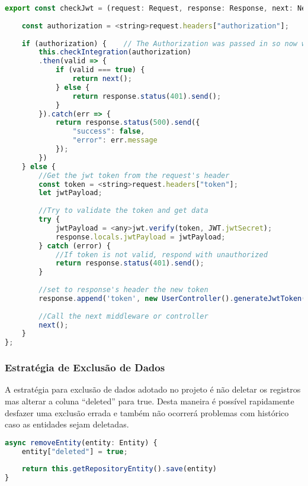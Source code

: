 \begin{lstlisting}[language=JavaScript, caption={Função para validação de autenticação da API}]
export const checkJwt = (request: Request, response: Response, next: NextFunction) => {
	
	const authorization = <string>request.headers["authorization"];
	
	if (authorization) {    // The Authorization was passed in so now we validate it
		this.checkIntegration(authorization)
		.then(valid => {
			if (valid === true) {
				return next();
			} else {
				return response.status(401).send();  
			}
		}).catch(err => {
			return response.status(500).send({
				"success": false,
				"error": err.message
			});
		})
	} else {
		//Get the jwt token from the request's header
		const token = <string>request.headers["token"];
		let jwtPayload;
		
		//Try to validate the token and get data
		try {
			jwtPayload = <any>jwt.verify(token, JWT.jwtSecret);
			response.locals.jwtPayload = jwtPayload;
		} catch (error) {
			//If token is not valid, respond with unauthorized
			return response.status(401).send();
		}
		
		//set to response's header the new token
		response.append('token', new UserController().generateJwtToken(<User> jwtPayload));
		
		//Call the next middleware or controller
		next();
	}
};

\end{lstlisting}


\subsubsection{Estratégia de Exclusão de Dados}

A estratégia para exclusão de dados adotado no projeto é não deletar os registros mas alterar a coluna ``deleted'' para true. Desta maneira é possível rapidamente desfazer uma exclusão errada e também não ocorrerá problemas com histórico caso as entidades sejam deletadas.

\begin{lstlisting}[language=JavaScript, caption={Método para exclusão de registro}]
async removeEntity(entity: Entity) {
	entity["deleted"] = true;
	
	return this.getRepositoryEntity().save(entity)
}
\end{lstlisting}

